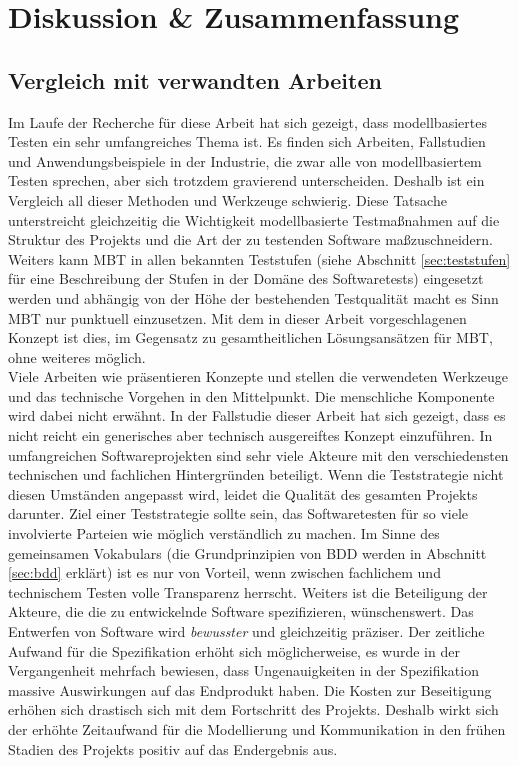 \makeatletter\ifthesis@masterthesis
\chapter{Diskussion \& Zusammenfassung}
\label{sec:discussion}

\section{Vergleich mit verwandten Arbeiten}

Im Laufe der Recherche für diese Arbeit hat sich gezeigt, dass modellbasiertes Testen ein sehr umfangreiches Thema ist. Es finden sich Arbeiten, Fallstudien und Anwendungsbeispiele in der Industrie, die zwar alle von modellbasiertem Testen sprechen, aber sich trotzdem gravierend unterscheiden. Deshalb ist ein Vergleich all dieser Methoden und Werkzeuge schwierig. Diese Tatsache unterstreicht gleichzeitig die Wichtigkeit modellbasierte Testmaßnahmen auf die Struktur des Projekts und die Art der zu testenden Software maßzuschneidern. Weiters kann \Gls{MBT} in allen bekannten Teststufen (siehe Abschnitt \ref{sec:teststufen} für eine Beschreibung der Stufen in der Domäne des Softwaretests) eingesetzt werden und abhängig von der Höhe der bestehenden Testqualität macht es Sinn \Gls{MBT} nur punktuell einzusetzen. Mit dem in dieser Arbeit vorgeschlagenen Konzept ist dies, im Gegensatz zu gesamtheitlichen Lösungsansätzen für \Gls{MBT}, ohne weiteres möglich.\\
Viele Arbeiten wie \cite{pretschner_one_2005} \cite{pinheiro_model-based_2013} \cite{sensler_testautomatisierung_2011} präsentieren Konzepte und stellen die verwendeten Werkzeuge und das technische Vorgehen in den Mittelpunkt. Die menschliche Komponente wird dabei nicht erwähnt. In der Fallstudie dieser Arbeit hat sich gezeigt, dass es nicht reicht ein generisches aber technisch ausgereiftes Konzept einzuführen. In umfangreichen Softwareprojekten sind sehr viele Akteure mit den verschiedensten technischen und fachlichen Hintergründen beteiligt. Wenn die Teststrategie nicht diesen Umständen angepasst wird, leidet die Qualität des gesamten Projekts darunter. Ziel einer Teststrategie sollte sein, das Softwaretesten für so viele involvierte Parteien wie möglich verständlich zu machen. Im Sinne des gemeinsamen Vokabulars (die Grundprinzipien von \Gls{BDD} werden in Abschnitt \ref{sec:bdd} erklärt) ist es nur von Vorteil, wenn zwischen fachlichem und technischem Testen volle Transparenz herrscht. Weiters ist die Beteiligung der Akteure, die die zu entwickelnde Software spezifizieren, wünschenswert. Das Entwerfen von Software wird \textit{bewusster} und gleichzeitig präziser. Der zeitliche Aufwand für die Spezifikation erhöht sich möglicherweise, es wurde in der Vergangenheit mehrfach bewiesen, dass Ungenauigkeiten in der Spezifikation massive Auswirkungen auf das Endprodukt haben. Die Kosten zur Beseitigung erhöhen sich drastisch sich mit dem Fortschritt des Projekts. Deshalb wirkt sich der erhöhte Zeitaufwand für die Modellierung und Kommunikation in den frühen Stadien des Projekts positiv auf das Endergebnis aus.\\
